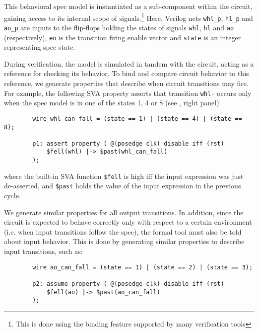 This behavioral spec model is instantiated as a sub-component within the
circuit, gaining access to its internal scope of signals.\footnote{This is done
using the binding feature supported by many verification tools} Here, Verilog
nets \texttt{whl\_p}, \texttt{hl\_p} and \texttt{ao\_p} are inputs to the
flip-flops holding the states of signals \texttt{whl}, \texttt{hl} and
\texttt{ao} (respectively), \texttt{en} is the transition firing enable vector
and \texttt{state} is an integer representing spec state.

During verification, the model is simulated in tandem with the circuit, acting
as a reference for checking its behavior. To bind and compare circuit behavior
to this reference, we generate properties that describe when circuit
transitions may fire. For example, the following SVA property asserts that
transition \texttt{whl-} occurs only when the spec model is in one of the
states 1, 4 or 8 (see , right panel):

\vspace{0.2cm}

\begin{tcolorbox}[frame hidden,interior hidden,boxsep=0pt,boxrule=1pt]
	\footnotesize
	\begin{verbatim}
		wire whl_can_fall = (state == 1) | (state == 4) | (state == 8);

		p1: assert property ( @(posedge clk) disable iff (rst)
		    $fell(whl) |-> $past(whl_can_fall)
		);
	\end{verbatim}
\end{tcolorbox}

where the built-in SVA function \texttt{\$fell} is high iff the input
expression was just de-asserted, and \texttt{\$past} holds the value of the
input expression in the previous cycle.

We generate similar properties for all output transitions. In addition, since
the circuit is expected to behave correctly only with respect to a certain
environment (i.e. when input transitions follow the spec), the formal tool
must also be told about input behavior. This is done by generating similar
properties to describe input transitions, such as:

\vspace{0.2cm}

\begin{tcolorbox}[frame hidden,interior hidden,boxsep=0pt,boxrule=1pt]
	\footnotesize
	\begin{verbatim}
		wire ao_can_fall = (state == 1) | (state == 2) | (state == 3);

		p2: assume property ( @(posedge clk) disable iff (rst)
		    $fell(ao) |-> $past(ao_can_fall)
		);
	\end{verbatim}
\end{tcolorbox}

